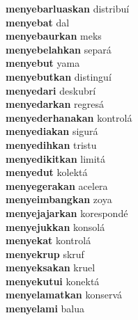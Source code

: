 \textbf{menyebarluaskan } distribuí \\
\textbf{menyebat } dal \\
\textbf{menyebaurkan } meks \\
\textbf{menyebelahkan } separá \\
\textbf{menyebut } yama \\
\textbf{menyebutkan } distinguí \\
\textbf{menyedari } deskubrí \\
\textbf{menyedarkan } regresá \\
\textbf{menyederhanakan } kontrolá \\
\textbf{menyediakan } sigurá \\
\textbf{menyedihkan } tristu \\
\textbf{menyedikitkan } limitá \\
\textbf{menyedut } kolektá \\
\textbf{menyegerakan } acelera \\
\textbf{menyeimbangkan } zoya \\
\textbf{menyejajarkan } korespondé \\
\textbf{menyejukkan } konsolá \\
\textbf{menyekat } kontrolá \\
\textbf{menyekrup } skruf \\
\textbf{menyeksakan } kruel \\
\textbf{menyekutui } konektá \\
\textbf{menyelamatkan } konservá \\
\textbf{menyelami } balua \\
